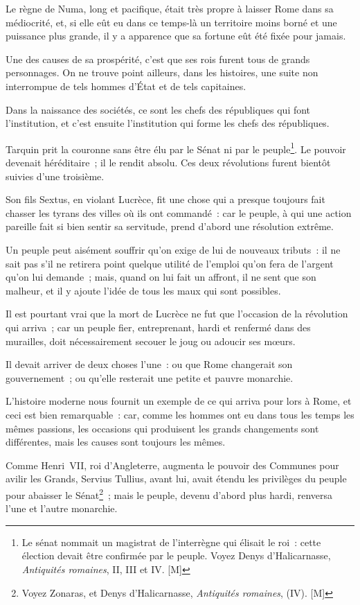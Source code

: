 \documentclass[french,twoside]{book} %
\begin{document}
Le règne de Numa, long et pacifique, était très propre à laisser Rome dans sa médiocrité, et, si elle eût eu dans ce temps-là un territoire moins borné et une puissance plus grande, il y a apparence que sa fortune eût été fixée pour jamais.\par
Une des causes de sa prospérité, c’est que ses rois furent tous de grands personnages. On ne trouve point ailleurs, dans les histoires, une suite non interrompue de tels hommes d’État et de tels capitaines.\par
Dans la naissance des sociétés, ce sont les chefs des républiques qui font l’institution, et c’est ensuite l’institution qui forme les chefs des républiques.\par
Tarquin prit la couronne sans être élu par le Sénat ni par le peuple\footnote{Le sénat nommait un magistrat de l’interrègne qui élisait le roi : cette élection devait être confirmée par le peuple. Voyez Denys d’Halicarnasse, {\itshape Antiquités romaines}, II, III et IV. [M]}. Le pouvoir devenait héréditaire ; il le rendit absolu. Ces deux révolutions furent bientôt suivies d’une troisième.\par
Son fils Sextus, en violant Lucrèce, fit une chose qui a presque toujours fait chasser les tyrans des villes où ils ont commandé : car le peuple, à qui une action pareille fait si bien sentir sa servitude, prend d’abord une résolution extrême.\par
Un peuple peut aisément souffrir qu’on exige de lui de nouveaux tributs : il ne sait pas s’il ne retirera point quelque utilité de l’emploi qu’on fera de l’argent qu’on lui demande ; mais, quand on lui fait un affront, il ne sent que son malheur, et il y ajoute l’idée de tous les maux qui sont possibles.\par
Il est pourtant vrai que la mort de Lucrèce ne fut que l’occasion de la révolution qui arriva ; car un peuple fier, entreprenant, hardi et renfermé dans des murailles, doit nécessairement secouer le joug ou adoucir ses mœurs.\par
Il devait arriver de deux choses l’une : ou que Rome changerait son gouvernement ; ou qu’elle resterait une petite et pauvre monarchie.\par
L’histoire moderne nous fournit un exemple de ce qui arriva pour lors à Rome, et ceci est bien remarquable : car, comme les hommes ont eu dans tous les temps les mêmes passions, les occasions qui produisent les grands changements sont différentes, mais les causes sont toujours les mêmes.\par
Comme Henri VII, roi d’Angleterre, augmenta le pouvoir des Communes pour avilir les Grands, Servius Tullius, avant lui, avait étendu les privilèges du peuple pour abaisser le Sénat\footnote{Voyez Zonaras, et Denys d’Halicarnasse, {\itshape Antiquités romaines}, (IV). [M]} ; mais le peuple, devenu d’abord plus hardi, renversa l’une et l’autre monarchie.\par
\end{document}
